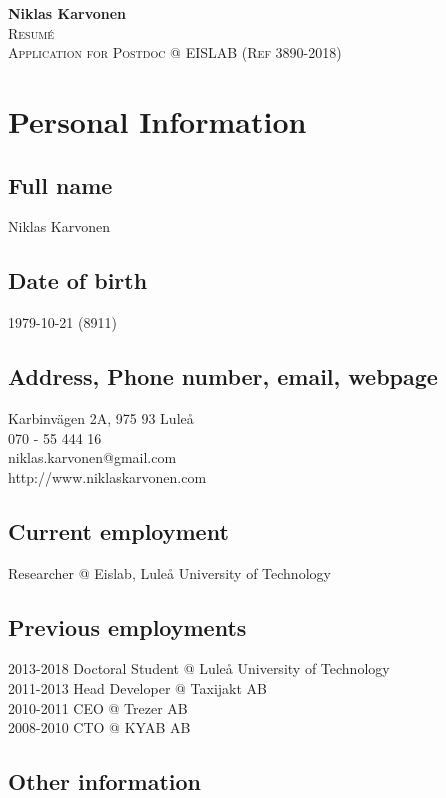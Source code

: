 \documentclass{article}
\makeatletter
\newlength\drop
\newcommand*\titleM{\begingroup%
\setlength\drop{0.08\textheight}
\centering
\vspace*{\drop}
{\Huge\bfseries Niklas Karvonen}\\[\baselineskip]
{\scshape Resumé}\\[\baselineskip]
\vfill
{\large\scshape Application for Postdoc @ EISLAB (Ref 3890-2018)}\par
\vfill
{\scshape \@date}\par
\vspace*{2\drop}
\endgroup}
\makeatother
\begin{document}
\begin{titlingpage}
\titleM
\end{titlingpage}
\newpage

\tableofcontents
\newpage

\section{Personal Information}


\subsection{Full name} Niklas Karvonen  \\
\subsection{Date of birth} 1979-10-21 (8911) \\
\subsection{Address, Phone number, email, webpage}
Karbinvägen 2A, 975 93 Luleå \\
070 - 55 444 16 \\ 
niklas.karvonen@gmail.com \\
http://www.niklaskarvonen.com \\

\subsection{Current employment} Researcher @ Eislab, Luleå University of Technology \\
\subsection{Previous employments}
2013-2018 Doctoral Student @ Luleå University of Technology \\
2011-2013 Head Developer @ Taxijakt AB \\
2010-2011 CEO @ Trezer AB \\
2008-2010 CTO @ KYAB AB \\

\subsection{Other information}
\end{document}
